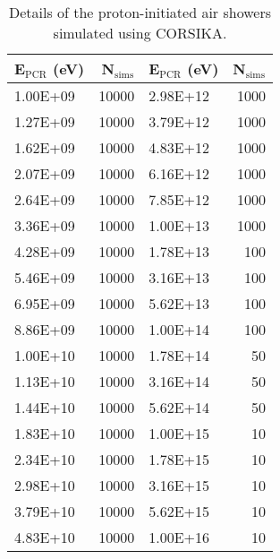 \begin{table}
	\begin{center}
	\caption{Details of the proton-initiated air showers simulated using CORSIKA.}
	\label{tab:CORSIKA_proton_sims}
	\begin{tabular}{l r | l r }%
		\hline
		{\bf E$\bm{_{\mathrm{PCR}}}$ (eV)} & {\bf N$\bm{_{\mathrm{sims}}}$} & {\bf E$\bm{_{\mathrm{PCR}}}$ (eV)} & {\bf N$\bm{_{\mathrm{sims}}}$} \\ %
		\hline
		1.00E+09    & 10000   & 2.98E+12    & 1000    \\
		1.27E+09    & 10000   & 3.79E+12    & 1000    \\
		1.62E+09    & 10000   & 4.83E+12    & 1000    \\
		2.07E+09    & 10000   & 6.16E+12    & 1000    \\
		2.64E+09    & 10000   & 7.85E+12    & 1000    \\
		3.36E+09    & 10000   & 1.00E+13    & 1000    \\
		4.28E+09    & 10000   & 1.78E+13    & 100     \\
		5.46E+09    & 10000   & 3.16E+13    & 100     \\
		6.95E+09    & 10000   & 5.62E+13    & 100     \\
		8.86E+09    & 10000   & 1.00E+14    & 100     \\
		1.00E+10    & 10000   & 1.78E+14    & 50      \\
		1.13E+10    & 10000   & 3.16E+14    & 50      \\
		1.44E+10    & 10000   & 5.62E+14    & 50      \\
		1.83E+10    & 10000   & 1.00E+15    & 10      \\
		2.34E+10    & 10000   & 1.78E+15    & 10      \\
		2.98E+10    & 10000   & 3.16E+15    & 10      \\
		3.79E+10    & 10000   & 5.62E+15    & 10      \\
		4.83E+10    & 10000   & 1.00E+16    & 10      \\

\end{tabular}
\end{center}
\end{table}
